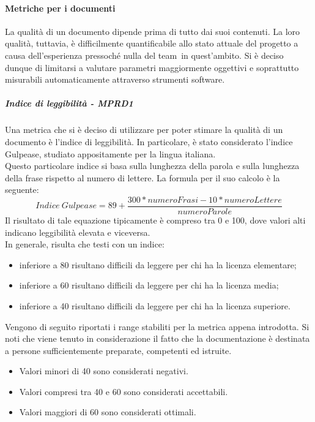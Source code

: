 \documentclass[../PianoDiQualifica.tex]{subfiles}
\begin{document}
			\paragraph{Metriche per i documenti}
			La qualità di un documento dipende prima di tutto dai suoi contenuti. La loro qualità, tuttavia, è difficilmente quantificabile allo stato attuale del progetto a causa dell'esperienza pressoché nulla del team\g\ in quest'ambito. Si è deciso dunque di limitarsi a valutare parametri maggiormente oggettivi e soprattutto misurabili automaticamente attraverso strumenti software\g.
				\subparagraph{Indice di leggibilità - MPRD1}\label{MPRD1}
				Una metrica che si è deciso di utilizzare per poter stimare la qualità di un documento è l'indice di leggibilità. In particolare, è stato considerato l'indice Gulpease\g, studiato appositamente per la lingua italiana.				\\Questo particolare indice si basa sulla lunghezza della parola e sulla lunghezza della frase rispetto al numero di lettere. La formula per il suo calcolo è la seguente:
				\begin{equation}
					Indice \  Gulpease = 89 + \frac{300*numeroFrasi-10*numeroLettere}{numeroParole}
				\end{equation}
				Il risultato di tale equazione tipicamente è compreso tra 0 e 100, dove valori alti indicano leggibilità elevata e viceversa.\\
				In generale, risulta che testi con un indice:
				\begin{itemize}
					\item inferiore a 80 risultano difficili da leggere per chi ha la licenza elementare;
					\item inferiore a 60 risultano difficili da leggere per chi ha la licenza media;
					\item inferiore a 40 risultano difficili da leggere per chi ha la licenza superiore.
				\end{itemize}
				Vengono di seguito riportati i range stabiliti per la metrica appena introdotta. Si noti che viene tenuto in considerazione il fatto che la documentazione è destinata a persone sufficientemente preparate, competenti ed istruite.
				\begin{itemize}
					\item Valori minori di 40 sono considerati negativi.
					\item Valori compresi tra 40 e 60 sono considerati accettabili.
					\item Valori maggiori di 60 sono considerati ottimali. 
				\end{itemize}
\end{document}
